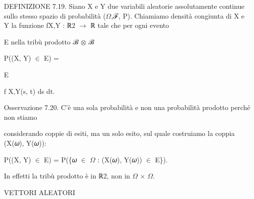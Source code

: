 \documentclass[a4paper,portrait,12pt]{article}
\begin{document}
\begin{flushleft}
DEFINIZIONE 7.19. Siano X e Y due variabili aleatorie assolutamente continue sullo stesso spazio di probabilit\`{a} ($\Omega$,ℱ, P). Chiamiamo densit\`{a} congiunta di X e Y la funzione fX,Y : ℝ2 $\rightarrow$ ℝ tale che per ogni evento
\end{flushleft}


\begin{flushleft}
E nella tribù prodotto ℬ $\otimes$ ℬ
\end{flushleft}


\begin{flushleft}
P((X, Y) $\in$ E) =
\end{flushleft}





\begin{flushleft}
E
\end{flushleft}





\begin{flushleft}
f X,Y(s, t) ds dt.
\end{flushleft}





\begin{flushleft}
Osservazione 7.20. C'\`{e} una sola probabilit\`{a} e non una probabilit\`{a} prodotto perch\'{e} non stiamo
\end{flushleft}


\begin{flushleft}
considerando coppie di esiti, ma un solo esito, sul quale costruiamo la coppia (X(𝜔), Y(𝜔)):
\end{flushleft}


\begin{flushleft}
P((X, Y) $\in$ E) = P(\{𝜔 $\in$ $\Omega$ : (X(𝜔), Y(𝜔)) $\in$ E\}).
\end{flushleft}


\begin{flushleft}
In effetti la tribù prodotto \`{e} in ℝ2, non in $\Omega$ × $\Omega$.
\end{flushleft}










\begin{flushleft}
VETTORI ALEATORI
\end{flushleft}
\end{document}
